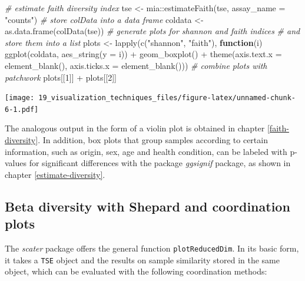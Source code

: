 \documentclass[
]{book}
\newenvironment{Shaded}{\begin{snugshade}}{\end{snugshade}}
\newcommand{\AttributeTok}[1]{\textcolor[rgb]{0.77,0.63,0.00}{#1}}
\newcommand{\CommentTok}[1]{\textcolor[rgb]{0.56,0.35,0.01}{\textit{#1}}}
\newcommand{\ControlFlowTok}[1]{\textcolor[rgb]{0.13,0.29,0.53}{\textbf{#1}}}
\newcommand{\DecValTok}[1]{\textcolor[rgb]{0.00,0.00,0.81}{#1}}
\newcommand{\FunctionTok}[1]{\textcolor[rgb]{0.00,0.00,0.00}{#1}}
\newcommand{\NormalTok}[1]{#1}
\newcommand{\OtherTok}[1]{\textcolor[rgb]{0.56,0.35,0.01}{#1}}
\newcommand{\SpecialCharTok}[1]{\textcolor[rgb]{0.00,0.00,0.00}{#1}}
\newcommand{\StringTok}[1]{\textcolor[rgb]{0.31,0.60,0.02}{#1}}
\begin{document}
\begin{Shaded}
\begin{Highlighting}[]
\CommentTok{\# estimate faith diversity index}
\NormalTok{tse }\OtherTok{\textless{}{-}}\NormalTok{ mia}\SpecialCharTok{::}\FunctionTok{estimateFaith}\NormalTok{(tse,}
                          \AttributeTok{assay\_name =} \StringTok{"counts"}\NormalTok{)}
\CommentTok{\# store colData into a data frame}
\NormalTok{coldata }\OtherTok{\textless{}{-}} \FunctionTok{as.data.frame}\NormalTok{(}\FunctionTok{colData}\NormalTok{(tse))}
\CommentTok{\# generate plots for shannon and faith indices}
\CommentTok{\# and store them into a list}
\NormalTok{plots }\OtherTok{\textless{}{-}} \FunctionTok{lapply}\NormalTok{(}\FunctionTok{c}\NormalTok{(}\StringTok{"shannon"}\NormalTok{, }\StringTok{"faith"}\NormalTok{),}
                \ControlFlowTok{function}\NormalTok{(i) }\FunctionTok{ggplot}\NormalTok{(coldata, }\FunctionTok{aes\_string}\NormalTok{(}\AttributeTok{y =}\NormalTok{ i)) }\SpecialCharTok{+}
                  \FunctionTok{geom\_boxplot}\NormalTok{() }\SpecialCharTok{+}
                  \FunctionTok{theme}\NormalTok{(}\AttributeTok{axis.text.x =} \FunctionTok{element\_blank}\NormalTok{(),}
                        \AttributeTok{axis.ticks.x =} \FunctionTok{element\_blank}\NormalTok{()))}
\CommentTok{\# combine plots with patchwork}
\NormalTok{plots[[}\DecValTok{1}\NormalTok{]] }\SpecialCharTok{+}\NormalTok{ plots[[}\DecValTok{2}\NormalTok{]]}
\end{Highlighting}
\end{Shaded}

\texttt{[image: 19\_visualization\_techniques\_files/figure-latex/unnamed-chunk-6-1.pdf]}

The analogous output in the form of a violin plot is obtained in
chapter \ref{faith-diversity}. In addition, box plots that group
samples according to certain information, such as origin, sex, age and
health condition, can be labeled with p-values for significant
differences with the package \emph{ggsignif} package, as shown in chapter
\ref{estimate-diversity}.

\hypertarget{beta-diversity-with-shepard-and-coordination-plots}{%
\subsection{Beta diversity with Shepard and coordination plots}\label{beta-diversity-with-shepard-and-coordination-plots}}

The \emph{scater} package offers the general function \texttt{plotReducedDim}. In
its basic form, it takes a \texttt{TSE} object and the results on sample
similarity stored in the same object, which can be evaluated with the
following coordination methods:
\end{document}
